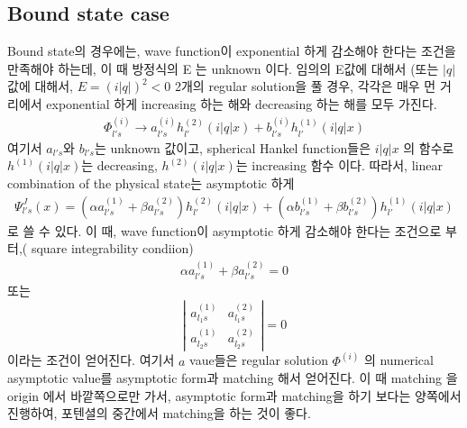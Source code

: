 \documentclass[10pt]{book}
\newcommand{\bea}{\begin{eqnarray}}
\newcommand{\eea}{\end{eqnarray}}
\begin{document}
\subsection{Bound state case}
Bound state의 경우에는, wave function이 exponential 하게 감소해야 한다는 
조건을 만족해야 하는데, 이 때 방정식의 E 는 unknown 이다. 임의의 E값에 대해서 
(또는 $|q|$ 값에 대해서, $E=(i|q|)^2<0$ 2개의 regular solution을 풀 경우,
각각은 매우 먼 거리에서 exponential 하게 increasing 하는 해와 decreasing 하는 해를
모두 가진다.
\bea
\Phi^{(i)}_{l's}\to a^{(i)}_{l's}h^{(2)}_{l'}(i|q|x)+b_{l's}^{(i)} h_{l'}^{(1)}(i|q|x)
\eea   
여기서 $a_{l's}$와 $b_{l's}$는 unknown 값이고, spherical Hankel function들은 
$i|q|x $ 의 함수로 $h^{(1)}(i|q|x)$는 decreasing, $h^{(2)}(i|q|x)$는 increasing 
함수 이다. 따라서, linear combination of the physical state는 
asymptotic 하게 
\bea
\Psi^J_{l's}(x)=(\alpha a^{(1)}_{l's}+\beta a^{(2)}_{l's})h_{l'}^{(2)}(i|q|x)
                      +(\alpha b_{l's}^{(1)}+\beta b^{(2)}_{l's}) h_{l'}^{(1)}(i|q|x)
\eea 
로 쓸 수 있다. 이 때, wave function이 asymptotic 하게 감소해야 한다는 
조건으로 부터,( square integrability condiion)
\bea
\alpha a^{(1)}_{l's}+\beta a^{(2)}_{l's}=0
\eea
또는 
\begin{equation}
\left\vert \begin{array}{cc} a^{(1)}_{l_1 s} & a^{(2)}_{l_1 s} \\
                                     a^{(1)}_{l_2 s} & a^{(2)}_{l_2 s} \end{array} \right\vert =0
\end{equation}
이라는 조건이 얻어진다. 여기서 $a$ vaue들은 regular solution $\Phi^{(i)}$ 의 
numerical asymptotic value를 asymptotic form과 matching 해서 얻어진다.
이 때 matching 을 origin 에서 바깥쪽으로만 가서, asymptotic form과 matching을 
하기 보다는 양쪽에서 진행하여, 포텐셜의 중간에서 matching을 하는 것이 좋다.
\end{document}

